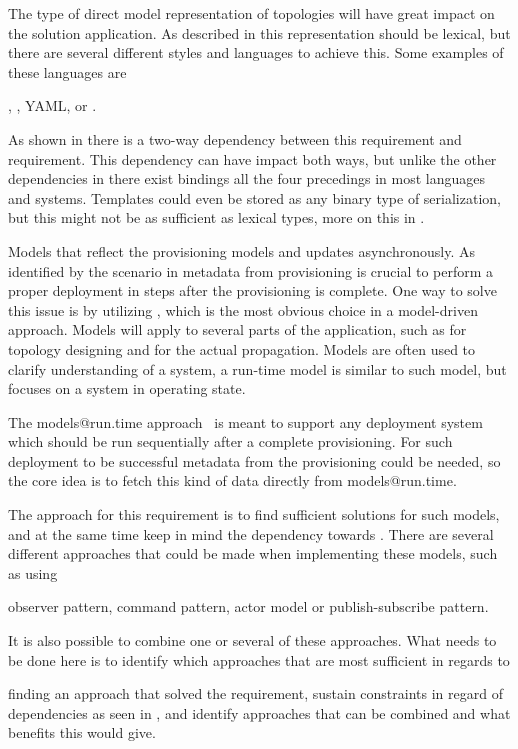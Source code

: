 The type of direct model representation of topologies will have great impact 
on the solution application.
As described in  this representation should be lexical,
but there are several different styles and languages to achieve this.
Some examples of these languages are 
\begin{ii}
  \iitem {},
  \iitem {},
  \iitem YAML,
  \iitem {} or
  \iitem {}.
\end{ii}
As shown in  there is a two-way dependency between 
this requirement and  requirement.
This dependency can have impact both ways, but unlike the other dependencies in
 there exist bindings all the four precedings in
most languages and systems.
Templates could even be stored as any binary type of serialization, 
but this might not be as sufficient as lexical types, more on this
in .

Models that reflect the provisioning models and updates asynchronously. 
As identified by the scenario in  metadata from provisioning is crucial to perform
a proper deployment in steps after the provisioning is complete.
One way to solve this issue is by utilizing , which is the most obvious choice in a
model-driven approach.
Models will apply to several parts of the application, such as for topology designing and for the actual propagation.
Models are often used to clarify understanding of a system,
a run-time model is similar to such model, but focuses on a system in operating state.

The models@run.time approach~\cite{DBLP:journals/dagstuhl-reports/AssmannBCF11}
is meant to support any deployment system which should be run sequentially after a complete provisioning.
For such deployment to be successful metadata from the provisioning could be needed,
so the core idea is to fetch this kind of data directly from models@run.time.

The approach for this requirement is to find sufficient solutions for such models,
and at the same time keep in mind the dependency towards .
There are several different approaches that could be made when implementing 
these models, such as using
\begin{ii}
  \iitem observer pattern,
  \iitem command pattern,
  \iitem actor model or
  \iitem publish-subscribe pattern.
\end{ii}
It is also possible to combine one or several of these approaches.
What needs to be done here is to identify which approaches that are most sufficient 
in regards to 
\begin{ii} 
  \iitem finding an approach that solved the requirement,
  \iitem sustain constraints in regard of dependencies as seen in , and
  \iitem identify approaches that can be combined and what benefits this would give.
\end{ii} 

